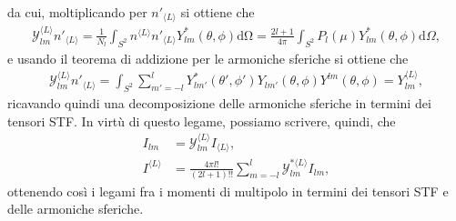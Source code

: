 da cui, moltiplicando per $n'_{\langle L \rangle}$ si ottiene che
\begin{align}
	\mathcal{Y}_{lm}^{\langle L \rangle} n'_{\langle L \rangle} = \frac{1}{N_l} \int_{S^2} n^{\langle L \rangle}n'_{\langle L \rangle} Y^*_{lm}(\theta,\phi) \mathrm{d\Omega} = \frac{2l+1}{4 \pi} \int_{S^2} P_l(\mu) Y_{lm}^*(\theta, \phi) \mathrm{d}\Omega,
\end{align}
e usando il teorema di addizione per le armoniche sferiche si ottiene che
\begin{align}
	\mathcal{Y}_{lm}^{\langle L \rangle} n'_{\langle L \rangle} = \int_{S^2} \sum_{m'=-l}^l Y_{lm'}^*(\theta', \phi') Y_{lm'}(\theta, \phi) Y^{lm}(\theta, \phi) = Y_{lm}^{\langle L \rangle}, 
\end{align}
ricavando quindi una decomposizione delle armoniche sferiche in termini dei tensori STF. In virtù di questo legame, possiamo scrivere, quindi, che
\begin{align}
	I_{lm} &= \mathcal{Y}_{lm}^{\langle L \rangle} I_{\langle L \rangle}, \\
	I^{\langle L \rangle} &= \frac{4 \pi l!}{(2l+1)!!} \sum_{m=-l}^l \mathcal{Y}_{lm}^{* \langle L \rangle} I_{lm},
\end{align}
ottenendo così i legami fra i momenti di multipolo in termini dei tensori STF e delle armoniche sferiche.
